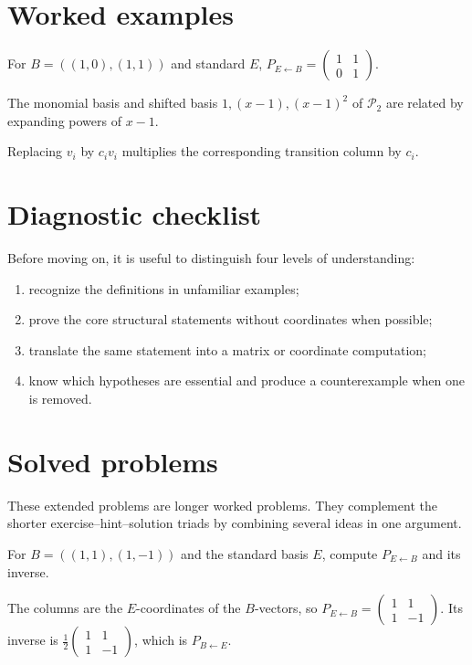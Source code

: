 \section{Worked examples}

\begin{example}\label{ex:i04-worked-01}
For $B=((1,0),(1,1))$ and standard $E$, $P_{E\leftarrow B}=\begin{pmatrix}1&1\\0&1\end{pmatrix}$.
\end{example}

\begin{example}\label{ex:i04-worked-02}
The monomial basis and shifted basis $1,(x-1),(x-1)^2$ of $\mathcal P_2$ are related by expanding powers of $x-1$.
\end{example}

\begin{example}\label{ex:i04-worked-03}
Replacing $v_i$ by $c_i v_i$ multiplies the corresponding transition column by $c_i$.
\end{example}

\section{Diagnostic checklist}
Before moving on, it is useful to distinguish four levels of understanding:
\begin{enumerate}
\item recognize the definitions in unfamiliar examples;
\item prove the core structural statements without coordinates when possible;
\item translate the same statement into a matrix or coordinate computation;
\item know which hypotheses are essential and produce a counterexample when one is removed.
\end{enumerate}

\section{Solved problems}
These extended problems are longer worked problems. They complement the shorter exercise--hint--solution triads by combining several ideas in one argument.

\begin{problem}\label{prob:i04-problem-01}
For $B=((1,1),(1,-1))$ and the standard basis $E$, compute $P_{E\leftarrow B}$ and its inverse.
\end{problem}
\begin{solution}
The columns are the $E$-coordinates of the $B$-vectors, so $P_{E\leftarrow B}=\begin{pmatrix}1&1\\1&-1\end{pmatrix}$. Its inverse is $\frac12\begin{pmatrix}1&1\\1&-1\end{pmatrix}$, which is $P_{B\leftarrow E}$.
\end{solution}

